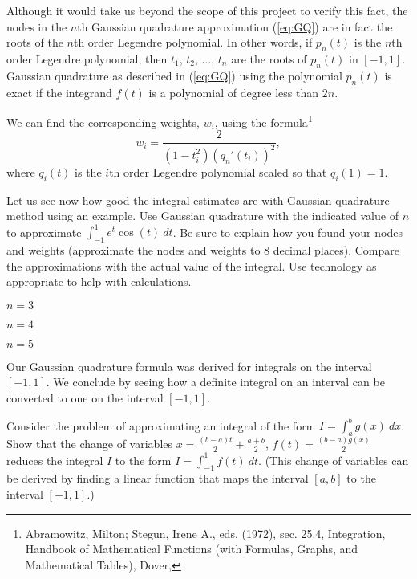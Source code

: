 Although it would take us beyond the scope of this project to verify this fact, the nodes in the $n$th Gaussian quadrature approximation (\ref{eq:GQ}) are in fact the roots of the $n$th order Legendre polynomial. In other words, if $p_n(t)$ is the $n$th order Legendre polynomial, then $t_1$, $t_2$, $\ldots$, $t_n$ are the roots of $p_n(t)$ in $[-1,1]$. Gaussian quadrature as described in (\ref{eq:GQ}) using the polynomial $p_n(t)$ is exact if the integrand $f(t)$ is a polynomial of degree less than $2n$.

We can find the corresponding weights, $w_i$, using the formula\footnote{Abramowitz, Milton; Stegun, Irene A., eds. (1972), sec. 25.4, Integration, Handbook of Mathematical Functions (with Formulas, Graphs, and Mathematical Tables), Dover,}
\begin{equation}
w_i = \frac{2}{(1-t_i^2)(q_n '(t_i))^2}, \label{eq:GQ_weights}
\end{equation}
where $q_i(t)$ is the $i$th order Legendre polynomial scaled so that $q_i(1)=1$.

\begin{pactivity} \label{act:GQ_example} Let us see now how good the integral estimates are with Gaussian quadrature method using an example. Use Gaussian quadrature with the indicated value of $n$ to approximate $\displaystyle \int_{-1}^1 e^t\cos(t) \ dt$. Be sure to explain how you found your nodes and weights (approximate the nodes and weights to 8 decimal places). Compare the approximations with the actual value of the integral. Use technology as appropriate to help with calculations. 
	\ba
	\item $n=3$
		
	\item $n=4$
	
	\item $n=5$
	

	\ea


\end{pactivity}

Our Gaussian quadrature formula was derived for integrals on the interval $[-1,1]$. We conclude by seeing how a definite integral on an interval can be converted to one on the interval $[-1,1]$.  

\begin{pactivity} Consider the problem of approximating an integral of the form $I = \int_a^b g(x) \ dx$.  Show that the change of variables $x = \frac{(b - a)t}{2} + \frac{a + b}{2}$, $f(t) = \frac{(b - a)g(x)}{2}$ reduces the integral $I$ to the form $I = \int_{-1}^1 f(t) \ dt$.  (This change of variables can be derived by finding a linear function that maps the interval $[a,b]$ to the interval $[-1,1]$.) 


\end{pactivity}

